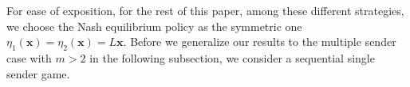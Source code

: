 \documentclass[12pt,journal,onecolumn]{IEEEtran}
\begin{document}

For ease of exposition, for the rest of this paper, among these different strategies, we choose the Nash equilibrium policy as the symmetric one $\eta_1(\boldsymbol{x})=\eta_2(\boldsymbol{x})=L\boldsymbol{x}$. Before we
generalize our results to the multiple sender case with $m>2$
in the following subsection, we consider a sequential single sender game.
\end{document}
